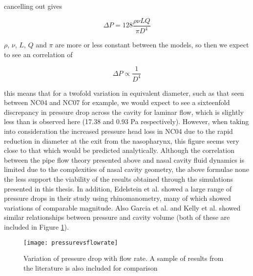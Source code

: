 cancelling out gives

\begin{equation}
  \Delta P = 128 \frac{\rho \nu L Q}{\pi D^4}
\end{equation}

$\rho$, $\nu$, $L$, $Q$ and $\pi$ are more or less constant between the models, so then we expect to see an correlation of

\begin{equation} \label{corollation}
  \Delta P \propto \frac{1}{D^4}
\end{equation}

this means that for a twofold variation in equivalent diameter, such as that seen between NC04 and NC07 for example, we would expect to see a sixteenfold discrepancy in pressure drop across the cavity for laminar flow, which is slightly less than is observed here (17.38 and 0.93 Pa respectively). However, when taking into consideration the increased pressure head loss in NC04 due to the rapid reduction in diameter at the exit from the nasopharynx, this figure seems very close to that which would be predicted analytically. Although the correlation between the pipe flow theory presented above and nasal cavity fluid dynamics is limited due to the complexities of nasal cavity geometry, the above formulae none the less support the viability of the results obtained through the simulations presented in this thesis.
In addition, Edelstein et al. \cite{Edelstein1996} showed a large range of pressure drops in their study using rhinomanometry, many of which showed variations of comparable magnitude. Also Garcia et al. \cite{Garcia2007} and Kelly et al. \cite{Kelly2004} showed similar relationships between pressure and cavity volume (both of these are included in Figure \ref{tab:pvv}).

  \begin{figure} 
    \texttt{[image: pressurevsflowrate]}
      \caption{Variation of pressure drop with flow rate. A sample of results from the literature is also included for comparison}
  \label{tab:pvv}
\end{figure}

%


